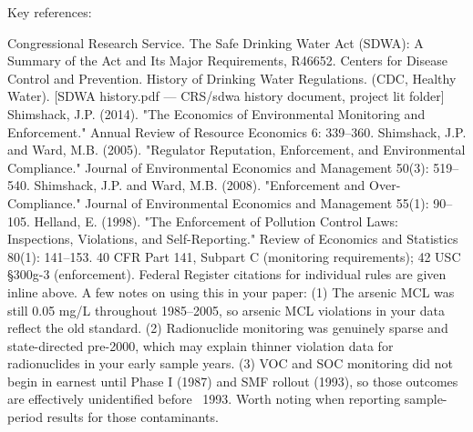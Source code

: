 Key references:

Congressional Research Service. The Safe Drinking Water Act (SDWA): A Summary of the Act and Its Major Requirements, R46652.
Centers for Disease Control and Prevention. History of Drinking Water Regulations. (CDC, Healthy Water).
[SDWA history.pdf — CRS/sdwa history document, project lit folder]
Shimshack, J.P. (2014). "The Economics of Environmental Monitoring and Enforcement." Annual Review of Resource Economics 6: 339–360.
Shimshack, J.P. and Ward, M.B. (2005). "Regulator Reputation, Enforcement, and Environmental Compliance." Journal of Environmental Economics and Management 50(3): 519–540.
Shimshack, J.P. and Ward, M.B. (2008). "Enforcement and Over-Compliance." Journal of Environmental Economics and Management 55(1): 90–105.
Helland, E. (1998). "The Enforcement of Pollution Control Laws: Inspections, Violations, and Self-Reporting." Review of Economics and Statistics 80(1): 141–153.
40 CFR Part 141, Subpart C (monitoring requirements); 42 USC §300g-3 (enforcement).
Federal Register citations for individual rules are given inline above.
A few notes on using this in your paper: (1) The arsenic MCL was still 0.05 mg/L throughout 1985–2005, so arsenic MCL violations in your data reflect the old standard. (2) Radionuclide monitoring was genuinely sparse and state-directed pre-2000, which may explain thinner violation data for radionuclides in your early sample years. (3) VOC and SOC monitoring did not begin in earnest until Phase I (1987) and SMF rollout (1993), so those outcomes are effectively unidentified before ~1993. Worth noting when reporting sample-period results for those contaminants.